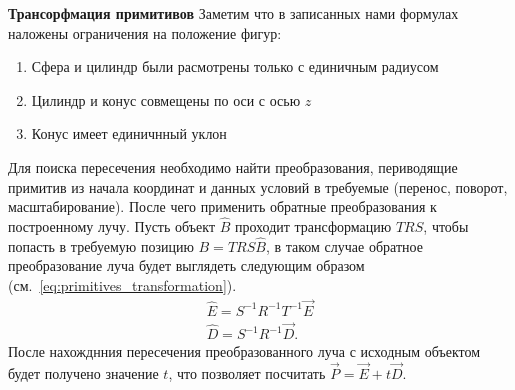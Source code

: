 \documentclass[a4paper,14pt,unknownkeysallowed]{extreport}
\begin{document}
\textbf{Трансорфмация примитивов}
Заметим что в записанных нами формулах наложены ограничения на положение фигур:
\begin{enumerate}
	\item Сфера и цилиндр были расмотрены только с единичным радиусом
	\item Цилиндр и конус совмещены по оси с осью $z$
	\item Конус имеет единичнный уклон
\end{enumerate}
Для поиска пересечения необходимо найти преобразования, периводящие примитив из начала координат и данных условий в требуемые (перенос, поворот, масштабирование).
После чего применить обратные преобразования к построенному лучу.
Пусть объект $\hat{B}$ проходит трансформацию $TRS$, чтобы попасть в требуемую позицию $B = TRS\hat{B}$, в таком случае обратное преобразование луча будет выглядеть
следующим образом (см.~\ref{eq:primitives_transformation}).
\begin{equation}
	\label{eq:primitives_transformation}
	\begin{aligned}
		\hat{E} = S^{-1}R^{-1}T^{-1}\vec{E}\\
		\hat{D} = S^{-1}R^{-1}\vec{D}.
	\end{aligned}
\end{equation}
После нахожднния пересечения преобразованного луча с исходным объектом будет получено значение $t$, что позволяет посчитать $\vec{P} = \vec{E} +t\vec{D}$.
\end{document}
